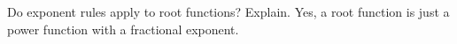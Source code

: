 {Do exponent rules apply to root functions? Explain.}
{Yes, a root function is just a power function with a fractional exponent.}
